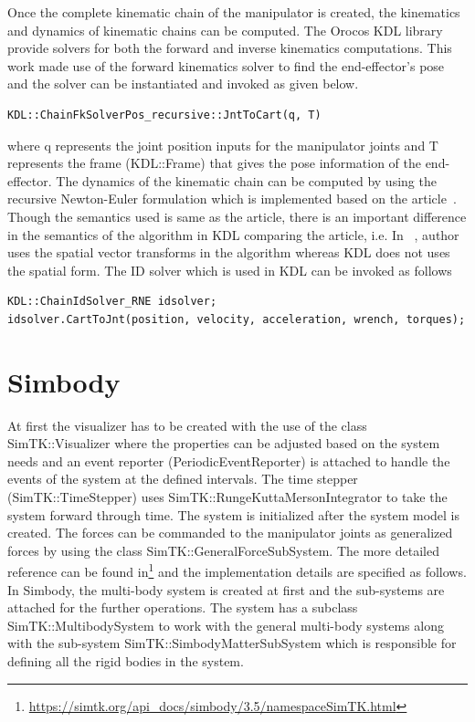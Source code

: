 Once the complete kinematic chain of the manipulator is created, the kinematics and dynamics of kinematic chains can be computed. The Orocos KDL library provide solvers for both the forward and inverse kinematics computations. This work made use of the forward kinematics solver to find the end-effector's pose and the solver can be instantiated and invoked as given below.

\begin{verbatim}
KDL::ChainFkSolverPos_recursive::JntToCart(q, T)
\end{verbatim} 

where q represents the joint position inputs for the manipulator joints and T represents the frame (KDL::Frame) that gives the pose information of the end-effector. The dynamics of the kinematic chain can be computed by using the recursive Newton-Euler formulation which is implemented based on the article~\cite{featherstone2014rigid}. Though the semantics used is same as the article, there is an important difference in the semantics of the algorithm in KDL comparing the article, i.e. In ~\cite{featherstone2014rigid}, author uses the spatial vector transforms in the algorithm whereas KDL does not uses the spatial form. The ID solver which is used in KDL can be invoked as follows

\begin{verbatim}
KDL::ChainIdSolver_RNE idsolver;
idsolver.CartToJnt(position, velocity, acceleration, wrench, torques);
\end{verbatim}

\chapter{Simbody}
\label{sec:appendixC}

At first the visualizer has to be created with the use of the class SimTK::Visualizer where the properties can be adjusted based on the system needs and an event reporter (PeriodicEventReporter) is attached to handle the events of the system at the defined intervals. The time stepper (SimTK::TimeStepper) uses SimTK::RungeKuttaMersonIntegrator to take the system forward through time. The system is initialized after the system model is created. The forces can be commanded to the manipulator joints as generalized forces by using the class SimTK::GeneralForceSubSystem. The more detailed reference can be found in\footnote{\url{https://simtk.org/api_docs/simbody/3.5/namespaceSimTK.html}} and the implementation details are specified as follows. In Simbody, the multi-body system is created at first and the sub-systems are attached for the further operations. The system has a subclass SimTK::MultibodySystem to work with the general multi-body systems along with the sub-system SimTK::SimbodyMatterSubSystem which is responsible for defining all the rigid bodies in the system. 

